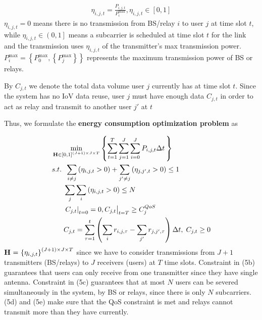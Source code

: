 \documentclass{ieeeaccess}
\begin{document}
\begin{align}
{{\eta _{i,j,t}} = \frac{{{P_{i,j,t}}}}{{P_i^{\max }}},{\eta _{i,j,t}} \in \left[ {0,1} \right]}
\end{align}
${\eta _{i,j,t}} = 0$ means there is no transmission from BS/relay $i$ to user $j$ at time slot $t$, while ${\eta _{i,j,t}} \in \left( {0,1} \right]$ means a subcarrier is scheduled at time slot $t$ for the link and the transmission uses ${\eta _{i,j,t}}$ of the transmitter's max transmission power. $P_i^{\max } = \left\{ {P_0^{\max },\left\{ {P_j^{\max }} \right\}} \right\}$ represents the maximum transmission power of BS or relays. 

By ${C_{j,t}}$ we denote the total data volume user $j$ currently has at time slot $t$. Since the system has no IoV data reuse, user $j$ must have enough data ${C_{j,t}}$ in order to act as relay and transmit to another user $j'$ at $t$

Thus, we formulate the \textbf{energy consumption optimization problem} as

\begin{subequations}
\begin{align}
& \mathop {\min }\limits_{{\mathbf{{\rm H}}} \in {{\left[ {0,1} \right]}^{\left( {J + 1} \right) \times J \times T}}} \left\{ {\sum\limits_{t = 1}^T {\sum\limits_{j = 1}^J {\sum\limits_{i = 0}^J {{P_{i,j,t}}\Delta t} \,} } } \right\} \\
& {s.t.} \;\; \sum\limits_{i \ne j} {\left( {{\eta _{i,j,t}} > 0} \right)}  + \sum\limits_{j' \ne j} {\left( {{\eta _{j,j',t}} > 0} \right) \le {\text{1}}} \\
& \;\;\;\;\;\; \sum\limits_j {\sum\limits_i {\left( {{\eta _{i,j,t}} > 0} \right)} }  \le N \\
& \;\;\;\;\;\; {\left. {{{\left. {{C_{j,t}}} \right|}_{t = 0}} = 0, {C_{j,t}}} \right|_{t = T}} \ge C_j^{QoS} \\
& \;\;\;\;\;\; {C_{j,t}} = \sum\limits_{\tau  = 1}^t {\left( {\sum\limits_i {{r_{i,j,\tau }}}  - \sum\limits_{j'} {{r_{j,j',\tau }}} } \right)\Delta t} ,\; {C_{j,t}} \ge 0
\end{align}
\end{subequations}
${\mathbf{{\rm H}}}{\text{ = }}{\left\{ {{\eta _{i,j,t}}} \right\}^{\left( {J + 1} \right) \times J \times T}}$ since we have to consider transmissions from ${J + 1}$ transmitters (BS/relays) to $J$ receivers (users) at $T$ time slots. 
Constraint in (5b) guarantees that users can only receive from one transmitter since they have single antenna. Constraint in (5c) guarantees that at most $N$ users can be severed simultaneously in the system, by BS or relays, since there is only $N$ subcarriers. (5d) and (5e) make sure that the QoS constraint is met and relays cannot transmit more than they have currently.
\end{document}
